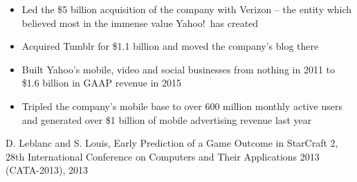 \documentclass[10pt,a4paper,ragged2e,withhyper]{altacv}
\begin{document}
\begin{paracol}{2}
		\divider
		
		\begin{itemize}
			\item Led the \$5 billion acquisition of the company with Verizon -- the entity which believed most in the immense value Yahoo!\ has created
			\item Acquired Tumblr for \$1.1 billion and moved the company's blog there
			\item Built Yahoo's mobile, video and social businesses from nothing in 2011 to \$1.6 billion in GAAP revenue in 2015
			\item Tripled the company's mobile base to over 600 million monthly active users and generated over \$1 billion of mobile advertising revenue last year
		\end{itemize}
		
		
		
		
		
		
		D. Leblanc and S. Louis, Early Prediction of a Game Outcome in StarCraft 2, 28th
		International Conference on Computers and Their Applications 2013 (CATA-2013),
		2013

		

		\switchcolumn
		
		
		
		\divider
		
		

\end{paracol}
\end{document}
